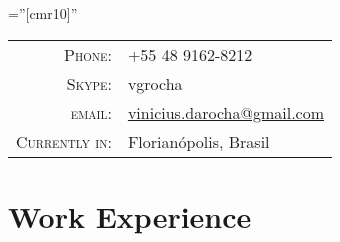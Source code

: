 \documentclass[a4paper,10pt]{article} %
\begin{document}
\pagestyle{empty} %

\font\fb=''[cmr10]'' %


\par{\bigskip\par} %


\begin{tabular}{rl}
\textsc{Phone:} & +55 48 9162-8212\\
\textsc{Skype:} & vgrocha\\
\textsc{email:} &
\href{mailto:vinicius.darocha@gmail.com}{vinicius.darocha@gmail.com} \\
\textsc{Currently in:} & Florianópolis, Brasil 
\end{tabular}


\section{Work Experience}
\end{document}
